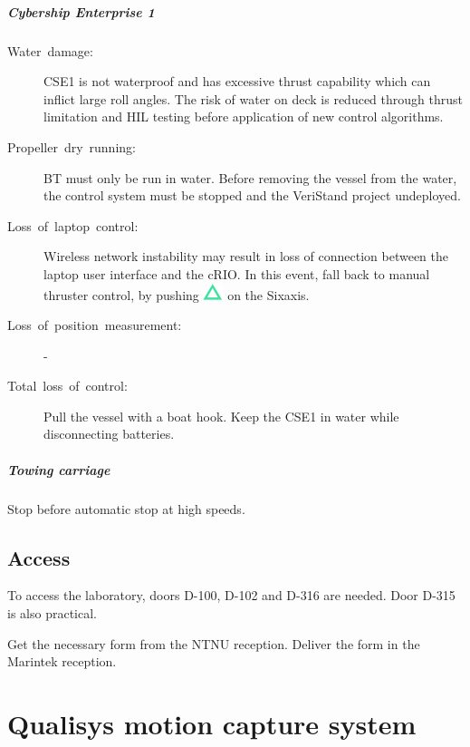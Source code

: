 \documentclass[a4paper,twoside,english]{report}
\begin{document}
\paragraph{Cybership Enterprise 1}
\begin{description}
\item [{Water~damage:}] CSE1 is not waterproof and has excessive thrust capability which can inflict large roll angles. The risk of water on deck is reduced through thrust limitation and HIL testing before application of new control algorithms. 
\item [{Propeller~dry~running:}] BT must only be run in water. Before removing the vessel from the water, the control system must be stopped and the VeriStand project undeployed.
\item [{Loss~of~laptop~control:}] Wireless network instability may result in loss of connection between the laptop user interface and the cRIO. In this event, fall back to manual thruster control, by pushing \includegraphics[scale=0.4]{fig/sixaxis_triangle} on the Sixaxis.
\item [{Loss~of~position~measurement:}] -
\item [{Total~loss~of~control:}] Pull the vessel with a boat hook. Keep the CSE1 in water while disconnecting batteries.
\end{description}

\paragraph{Towing carriage}
Stop before automatic stop at high speeds.

\clearpage{}

\section{Access}
To access the laboratory, doors D-100, D-102 and D-316 are needed.
Door D-315 is also practical.

Get the necessary form from the NTNU reception. Deliver the form in
the Marintek reception.

\clearpage{}

\chapter{Qualisys motion capture system}\label{chap:Qualisys-motion-capture}
\end{document}

